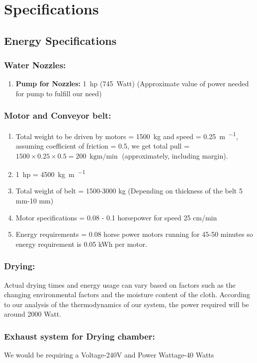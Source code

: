 \documentclass[12pt]{article} %
\begin{document}
\newpage
 \section{Specifications}
\subsection{Energy Specifications}


   \subsubsection{Water Nozzles:} 
   \begin{enumerate}
   \item \textbf{Pump for Nozzles:} \SI{1}{hp} (\SI{745}{Watt}) (Approximate value of power needed for pump to fulfill our need) 
\end{enumerate}

\subsubsection{Motor and Conveyor belt:} 
   \begin{enumerate}
   \item Total weight to be driven by motors = \SI{1500}{kg} and speed = 
\SI{0.25}{\m\per\min}, assuming coefficient of friction = 0.5, we get total pull =
$1500 \times 0.25 \times 0.5 = \SI{200}{\kg\m\per\min}$ (approximately, including margin).
\item \SI{1}{hp} = \SI{4500}{\kg\m\per\min}

\item Total weight of belt = 1500-3000 kg (Depending on thickness of the belt 5 mm-10 mm)

\item Motor specifications = 0.08 - 0.1 horsepower for speed 25 cm/min 
\item Energy requirements = 0.08 horse power motors running for 45-50 minutes so energy requirement is 0.05 kWh per motor.
\end{enumerate}
\subsubsection{Drying:} Actual drying times and energy usage can vary based on factors such as the changing environmental factors and the moisture content of the cloth. According to our analysis of the thermodynamics of our system, the power required will be around 2000 Watt.
\subsubsection{Exhaust system for Drying chamber:} We would be requiring a Voltage-240V and Power Wattage-40 Watts
\end{document}

